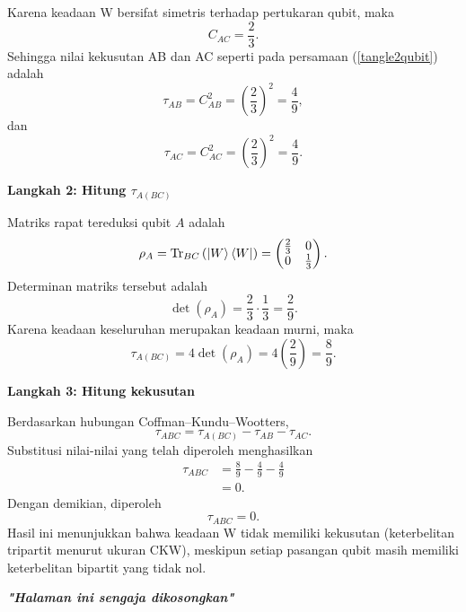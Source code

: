 Karena keadaan W bersifat simetris terhadap pertukaran qubit, maka
\begin{equation}
	C_{AC}=\frac{2}{3}.
\end{equation}
Sehingga nilai kekusutan AB dan AC seperti pada persamaan (\ref{tangle2qubit}) adalah
\begin{equation}
	\tau_{AB}=C_{AB}^{2}
	=\left(\frac{2}{3}\right)^{2}
	=\frac{4}{9},
\end{equation}
dan
\begin{equation}
	\tau_{AC}=C_{AC}^{2}
	=\left(\frac{2}{3}\right)^{2}
	=\frac{4}{9}.
\end{equation}

\textbf{Langkah 2: Hitung $\tau_{A(BC)}$}

Matriks rapat tereduksi qubit $A$ adalah
\begin{equation}
	\rho_A
	=
	\mathrm{Tr}_{BC}
	\left(
	\ket{W}\bra{W}
	\right)
	=
	\begin{pmatrix}
		\frac{2}{3}&0\\
		0&\frac{1}{3}
	\end{pmatrix}.
\end{equation}
Determinan matriks tersebut adalah
\begin{equation}
	\det(\rho_A)
	=
	\frac{2}{3}\cdot\frac{1}{3}
	=\frac{2}{9}.
\end{equation}
Karena keadaan keseluruhan merupakan keadaan murni, maka
\begin{equation}
	\tau_{A(BC)}
	=
	4\det(\rho_A)
	=
	4\left(\frac{2}{9}\right)
	=
	\frac{8}{9}.
\end{equation}

\textbf{Langkah 3: Hitung kekusutan}

Berdasarkan hubungan Coffman--Kundu--Wootters,
\begin{equation}
	\tau_{ABC}
	=
	\tau_{A(BC)}
	-
	\tau_{AB}
	-
	\tau_{AC}.
\end{equation}
Substitusi nilai-nilai yang telah diperoleh menghasilkan
\begin{align}
	\tau_{ABC}
	&=
	\frac{8}{9}
	-
	\frac{4}{9}
	-
	\frac{4}{9}
	\\
	&=
	0.
\end{align}
Dengan demikian, diperoleh
\begin{equation}
	\tau_{ABC}=0.
\end{equation}
Hasil ini menunjukkan bahwa keadaan W tidak memiliki kekusutan (keterbelitan tripartit menurut ukuran CKW), meskipun setiap pasangan qubit masih memiliki keterbelitan bipartit yang tidak nol.

\newpage
\thispagestyle{empty}
\begin{center}
	\vspace*{\fill}
	\textit{\textbf{"Halaman ini sengaja dikosongkan"}}
	\vspace*{\fill}
\end{center}
\pagebreak